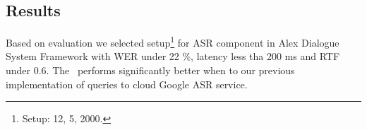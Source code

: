 \subsection{Results}
\label{sec:results}
Based on evaluation we selected setup\footnote{Setup:  12,  5,  2000.} for ASR component in Alex Dialogue System Framework with  WER under 22 \%, latency less tha 200 ms and RTF under 0.6.
The~ performs significantly better when to our previous implementation of queries to cloud Google ASR service.

